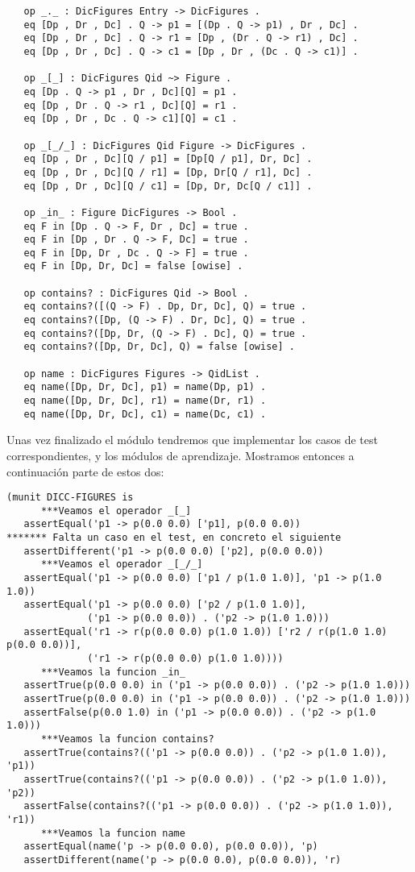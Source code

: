 {\codesize
\begin{verbatim}
   op _._ : DicFigures Entry -> DicFigures .
   eq [Dp , Dr , Dc] . Q -> p1 = [(Dp . Q -> p1) , Dr , Dc] .
   eq [Dp , Dr , Dc] . Q -> r1 = [Dp , (Dr . Q -> r1) , Dc] .
   eq [Dp , Dr , Dc] . Q -> c1 = [Dp , Dr , (Dc . Q -> c1)] .

   op _[_] : DicFigures Qid ~> Figure .
   eq [Dp . Q -> p1 , Dr , Dc][Q] = p1 .
   eq [Dp , Dr . Q -> r1 , Dc][Q] = r1 .
   eq [Dp , Dr , Dc . Q -> c1][Q] = c1 . 

   op _[_/_] : DicFigures Qid Figure -> DicFigures .
   eq [Dp , Dr , Dc][Q / p1] = [Dp[Q / p1], Dr, Dc] .
   eq [Dp , Dr , Dc][Q / r1] = [Dp, Dr[Q / r1], Dc] .
   eq [Dp , Dr , Dc][Q / c1] = [Dp, Dr, Dc[Q / c1]] .

   op _in_ : Figure DicFigures -> Bool .
   eq F in [Dp . Q -> F, Dr , Dc] = true .
   eq F in [Dp , Dr . Q -> F, Dc] = true .
   eq F in [Dp, Dr , Dc . Q -> F] = true .
   eq F in [Dp, Dr, Dc] = false [owise] .

   op contains? : DicFigures Qid -> Bool .
   eq contains?([(Q -> F) . Dp, Dr, Dc], Q) = true .
   eq contains?([Dp, (Q -> F) . Dr, Dc], Q) = true .
   eq contains?([Dp, Dr, (Q -> F) . Dc], Q) = true .
   eq contains?([Dp, Dr, Dc], Q) = false [owise] .

   op name : DicFigures Figures -> QidList .
   eq name([Dp, Dr, Dc], p1) = name(Dp, p1) .
   eq name([Dp, Dr, Dc], r1) = name(Dr, r1) .
   eq name([Dp, Dr, Dc], c1) = name(Dc, c1) .
\end{verbatim}
}

Unas vez finalizado el módulo tendremos que implementar los casos de test correspondientes, y los módulos de aprendizaje. Mostramos entonces a continuación parte de estos dos: \par

{\codesize
\begin{verbatim}
(munit DICC-FIGURES is
      ***Veamos el operador _[_]
   assertEqual('p1 -> p(0.0 0.0) ['p1], p(0.0 0.0))
******* Falta un caso en el test, en concreto el siguiente
   assertDifferent('p1 -> p(0.0 0.0) ['p2], p(0.0 0.0))
      ***Veamos el operador _[_/_]
   assertEqual('p1 -> p(0.0 0.0) ['p1 / p(1.0 1.0)], 'p1 -> p(1.0 1.0))
   assertEqual('p1 -> p(0.0 0.0) ['p2 / p(1.0 1.0)], 
              ('p1 -> p(0.0 0.0)) . ('p2 -> p(1.0 1.0)))
   assertEqual('r1 -> r(p(0.0 0.0) p(1.0 1.0)) ['r2 / r(p(1.0 1.0) p(0.0 0.0))], 
              ('r1 -> r(p(0.0 0.0) p(1.0 1.0))))
      ***Veamos la funcion _in_
   assertTrue(p(0.0 0.0) in ('p1 -> p(0.0 0.0)) . ('p2 -> p(1.0 1.0)))
   assertTrue(p(0.0 0.0) in ('p1 -> p(0.0 0.0)) . ('p2 -> p(1.0 1.0)))
   assertFalse(p(0.0 1.0) in ('p1 -> p(0.0 0.0)) . ('p2 -> p(1.0 1.0)))
      ***Veamos la funcion contains?
   assertTrue(contains?(('p1 -> p(0.0 0.0)) . ('p2 -> p(1.0 1.0)), 'p1))
   assertTrue(contains?(('p1 -> p(0.0 0.0)) . ('p2 -> p(1.0 1.0)), 'p2))
   assertFalse(contains?(('p1 -> p(0.0 0.0)) . ('p2 -> p(1.0 1.0)), 'r1))
      ***Veamos la funcion name
   assertEqual(name('p -> p(0.0 0.0), p(0.0 0.0)), 'p)
   assertDifferent(name('p -> p(0.0 0.0), p(0.0 0.0)), 'r)
\end{verbatim}
}

